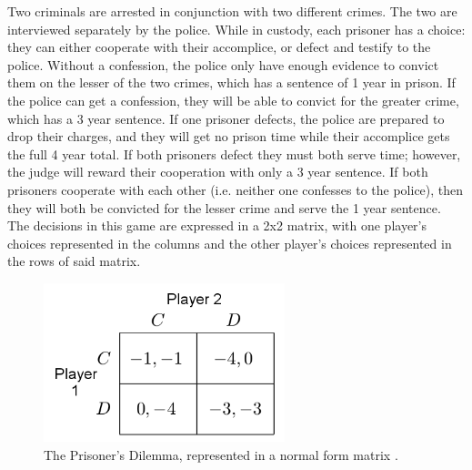 \begin{exmp}
  Two criminals are arrested in conjunction with two different crimes. The two are interviewed separately by the police. While in custody, each prisoner has a choice: they can either cooperate with their accomplice, or defect and testify to the police. Without a confession, the police only have enough evidence to convict them on the lesser of the two crimes, which has a sentence of 1 year in prison. If the police can get a confession, they will be able to convict for the greater crime, which has a 3 year sentence. If one prisoner defects, the police are prepared to drop their charges, and they will get no prison time while their accomplice gets the full 4 year total. If both prisoners defect they must both serve time; however, the judge will reward their cooperation with only a 3 year sentence. If both prisoners cooperate with each other (i.e. neither one confesses to the police), then they will both be convicted for the lesser crime and serve the 1 year sentence. The decisions in this game are expressed in a 2x2 matrix, with one player's choices represented in the columns and the other player's choices represented in the rows of said matrix.

\begin{figure}[H]
  \centering
  \includegraphics[width=7cm]{figures/ExampleGrid.png}
  \caption{The Prisoner's Dilemma, represented in a normal form matrix \cite{shoh09}.}
  \label{fig:prisoner}
\end{figure}
\end{exmp}


